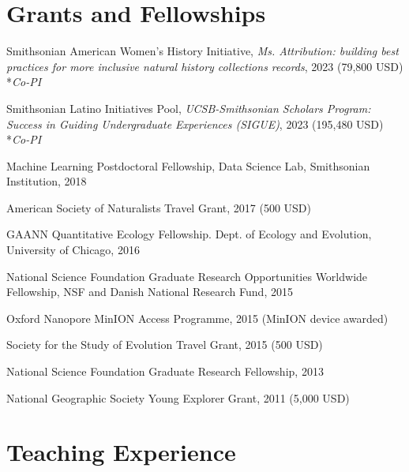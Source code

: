 \documentclass[letterpaper]{article}
\renewenvironment{itemize}{
  \begin{list}{}{
    \setlength{\leftmargin}{1.5em}
  }
}{
  \end{list}
}
\begin{document}
\section*{Grants and Fellowships}
\begin{itemize}
\item Smithsonian American Women's History Initiative, \textit{Ms. Attribution: building best practices for more inclusive natural history collections records}, 2023 (79,800 USD) *\textit{Co-PI}
\item Smithsonian Latino Initiatives Pool, \textit{UCSB-Smithsonian Scholars Program: Success in Guiding Undergraduate Experiences (SIGUE)}, 2023 (195,480 USD) *\textit{Co-PI}
\item Machine Learning Postdoctoral Fellowship, Data Science Lab, Smithsonian Institution, 2018
\item American Society of Naturalists Travel Grant, 2017 (500 USD)
\item GAANN Quantitative Ecology Fellowship. Dept. of Ecology and Evolution, University of Chicago, 2016
\item National Science Foundation Graduate Research Opportunities Worldwide Fellowship, NSF and Danish National Research Fund, 2015
\item Oxford Nanopore MinION Access Programme, 2015 (MinION device awarded)
\item Society for the Study of Evolution Travel Grant, 2015 (500 USD)
\item National Science Foundation Graduate Research Fellowship, 2013
\item National Geographic Society Young Explorer Grant, 2011 (5,000 USD)
\end{itemize}

\section*{Teaching Experience}
\end{document}
